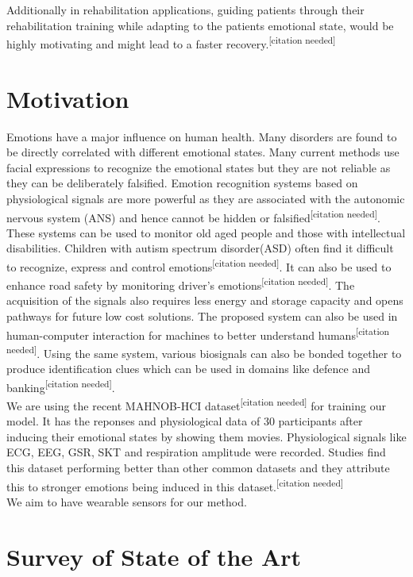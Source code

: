 \documentclass[11pt]{article}
\theoremstyle{definition}
\begin{document}
    Additionally in rehabilitation applications, guiding patients through their rehabilitation training while adapting to the patients emotional state, would be highly motivating and might lead to a faster recovery.\textsuperscript{[citation needed]}

  \section{Motivation}

Emotions have a major influence on human health. Many disorders are found to be directly correlated with different emotional states.  Many current methods use facial expressions to recognize the emotional states but they are not reliable as they can be deliberately falsified. Emotion recognition systems based on physiological signals are more powerful as they are associated with the autonomic nervous system (ANS) and hence cannot be hidden or falsified\textsuperscript{[citation needed]}. These systems can be used to monitor old aged people and those with intellectual disabilities. Children with autism spectrum disorder(ASD) often find it difficult to recognize, express and control emotions\textsuperscript{[citation needed]}. It can also be used to enhance road safety by monitoring driver's emotions\textsuperscript{[citation needed]}. The acquisition of the signals also requires less energy and storage capacity and opens pathways for future low cost solutions. The proposed system can also be used in human-computer interaction for machines to better understand humans\textsuperscript{[citation needed]}. Using the same system, various biosignals can also be bonded together to produce identification clues which can be used in domains like defence and banking\textsuperscript{[citation needed]}.\\

We are using the recent MAHNOB-HCI dataset\textsuperscript{[citation needed]} for training our model. It has the reponses and physiological data of 30 participants after inducing their emotional states by showing them movies. Physiological signals like ECG, EEG, GSR, SKT and respiration amplitude were recorded. Studies find this dataset performing better than other common datasets and they attribute this to stronger emotions being induced in this dataset.\textsuperscript{[citation needed]}\\
We aim to have wearable sensors for our method.
  \section{Survey of State of the Art}
\end{document}

